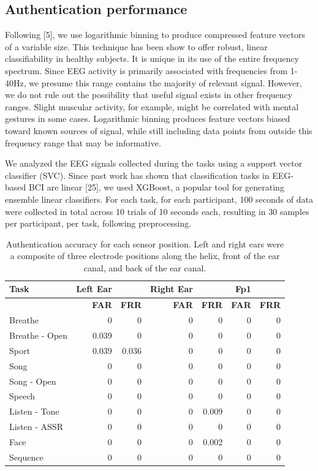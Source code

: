 \documentclass[11pt]{article}
\begin{document}
\subsection{Authentication performance}
\label{sec:orgfc9b24a}

Following [5], we use logarithmic binning to produce
compressed feature vectors of a variable size. This technique
has been show to offer robust, linear classifiability in healthy
subjects. It is unique in its use of the entire frequency
spectrum. Since EEG activity is primarily associated with frequencies
from 1-40Hz, we presume this range contains the majority of
relevant signal. However, we do not rule out the possibility
that useful signal exists in other frequency ranges. Slight muscular
activity, for example, might be correlated with mental gestures
in some cases. Logarithmic binning produces feature vectors
biased toward known sources of signal, while still including
data points from outside this frequency range that may be
informative.

We analyzed the EEG signals collected during the tasks
using a support vector classifier (SVC). Since past work has
shown that classification tasks in EEG-based BCI are linear
[25], we used XGBoost, a popular tool for generating
ensemble linear classifiers. For each task, for each participant, 
100 seconds of data were
collected in total across 10 trials of 10 seconds each, 
resulting in 30 samples per participant, per task,
following preprocessing.


\begin{table}[h]
\centering
\begin{tabular}{l|rr|rr|rr}
\textbf{Task} & \textbf{Left Ear} &  & \textbf{Right Ear} &  & \textbf{Fp1} & \\
\hline
 & \textbf{FAR} & \textbf{FRR} & \textbf{FAR} & \textbf{FRR} & \textbf{FAR} & \textbf{FRR}\\
\hline
Breathe & 0 & 0 & 0 & 0 & 0 & 0\\
Breathe - Open & 0.039 & 0 & 0 & 0 & 0 & 0\\
Sport & 0.039 & 0.036 & 0 & 0 & 0 & 0\\
Song & 0 & 0 & 0 & 0 & 0 & 0\\
Song - Open & 0 & 0 & 0 & 0 & 0 & 0\\
Speech & 0 & 0 & 0 & 0 & 0 & 0\\
Listen - Tone & 0 & 0 & 0 & 0.009 & 0 & 0\\
Listen - ASSR & 0 & 0 & 0 & 0 & 0 & 0\\
Face & 0 & 0 & 0 & 0.002 & 0 & 0\\
Sequence & 0 & 0 & 0 & 0 & 0 & 0\\
\end{tabular}
\caption{Authentication accuracy for each sensor position. Left and right ears were a composite of three electrode positions along the helix, front of the ear canal, and back of the ear canal.}
\end{table}
\end{document}
